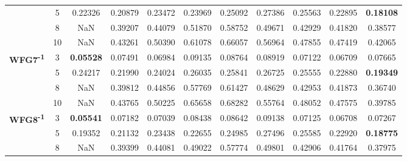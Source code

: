 \documentclass[conference]{IEEEtran}
\begin{document}
\begin{table*}[!htb]
\begin{tabular}{|c|c|c|c|c|c|c|c|c|c|c|}
		& 5          & 0.22326          & 0.20879           & 0.23472               & 0.23969          & 0.25092             & 0.27386             & 0.25563            & 0.22895              & \textbf{0.18108} \\ \cline{2-11} 
		& 8          & NaN              & 0.39207           & 0.44079               & 0.51870          & 0.58752             & 0.49671             & 0.42929            & 0.41820              & 0.38577          \\ \cline{2-11} 
		& 10         & NaN              & 0.43261           & 0.50390               & 0.61078          & 0.66057             & 0.56964             & 0.47855            & 0.47419              & 0.42065          \\ \hline
		\multirow{4}{*}{\textbf{WFG7\textsuperscript{-1}}}  & 3          & \textbf{0.05528} & 0.07491           & 0.06984               & 0.09135          & 0.08764             & 0.08919             & 0.07122            & 0.06709              & 0.07665          \\ \cline{2-11} 
		& 5          & 0.24217          & 0.21990           & 0.24024               & 0.26035          & 0.25841             & 0.26725             & 0.25555            & 0.22880              & \textbf{0.19349} \\ \cline{2-11} 
		& 8          & NaN              & 0.39812           & 0.44856               & 0.57769          & 0.61427             & 0.48629             & 0.42953            & 0.41873              & 0.36740          \\ \cline{2-11} 
		& 10         & NaN              & 0.43765           & 0.50225               & 0.65658          & 0.68282             & 0.55764             & 0.48052            & 0.47575              & 0.39785          \\ \hline
		\multirow{4}{*}{\textbf{WFG8\textsuperscript{-1}}}  & 3          & \textbf{0.05541} & 0.07182           & 0.07039               & 0.08438          & 0.08642             & 0.09138             & 0.07125            & 0.06708              & 0.07267          \\ \cline{2-11} 
		& 5          & 0.19352          & 0.21132           & 0.23438               & 0.22655          & 0.24985             & 0.27496             & 0.25585            & 0.22920              & \textbf{0.18775} \\ \cline{2-11} 
		& 8          & NaN              & 0.39399           & 0.44081               & 0.49022          & 0.57774             & 0.49801             & 0.42906            & 0.41764              & 0.37975          \\ \cline{2-11} 

\end{tabular}
\end{table*}
\end{document}

